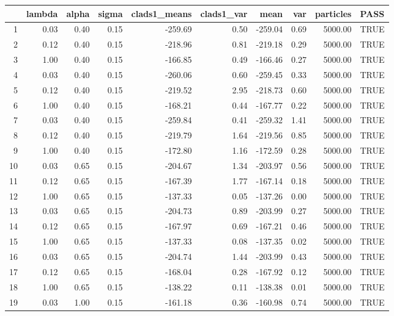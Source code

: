 \begin{table}[ht]
\centering
\begin{tabular}{rrrrrrrrrl}
  \hline
 & lambda & alpha & sigma & clads1\_means & clads1\_var & mean & var & particles & PASS \\ 
  \hline
1 & 0.03 & 0.40 & 0.15 & -259.69 & 0.50 & -259.04 & 0.69 & 5000.00 & TRUE \\ 
  2 & 0.12 & 0.40 & 0.15 & -218.96 & 0.81 & -219.18 & 0.29 & 5000.00 & TRUE \\ 
  3 & 1.00 & 0.40 & 0.15 & -166.85 & 0.49 & -166.46 & 0.27 & 5000.00 & TRUE \\ 
  4 & 0.03 & 0.40 & 0.15 & -260.06 & 0.60 & -259.45 & 0.33 & 5000.00 & TRUE \\ 
  5 & 0.12 & 0.40 & 0.15 & -219.52 & 2.95 & -218.73 & 0.60 & 5000.00 & TRUE \\ 
  6 & 1.00 & 0.40 & 0.15 & -168.21 & 0.44 & -167.77 & 0.22 & 5000.00 & TRUE \\ 
  7 & 0.03 & 0.40 & 0.15 & -259.84 & 0.41 & -259.32 & 1.41 & 5000.00 & TRUE \\ 
  8 & 0.12 & 0.40 & 0.15 & -219.79 & 1.64 & -219.56 & 0.85 & 5000.00 & TRUE \\ 
  9 & 1.00 & 0.40 & 0.15 & -172.80 & 1.16 & -172.59 & 0.28 & 5000.00 & TRUE \\ 
  10 & 0.03 & 0.65 & 0.15 & -204.67 & 1.34 & -203.97 & 0.56 & 5000.00 & TRUE \\ 
  11 & 0.12 & 0.65 & 0.15 & -167.39 & 1.77 & -167.14 & 0.18 & 5000.00 & TRUE \\ 
  12 & 1.00 & 0.65 & 0.15 & -137.33 & 0.05 & -137.26 & 0.00 & 5000.00 & TRUE \\ 
  13 & 0.03 & 0.65 & 0.15 & -204.73 & 0.89 & -203.99 & 0.27 & 5000.00 & TRUE \\ 
  14 & 0.12 & 0.65 & 0.15 & -167.97 & 0.69 & -167.21 & 0.46 & 5000.00 & TRUE \\ 
  15 & 1.00 & 0.65 & 0.15 & -137.33 & 0.08 & -137.35 & 0.02 & 5000.00 & TRUE \\ 
  16 & 0.03 & 0.65 & 0.15 & -204.74 & 1.44 & -203.99 & 0.43 & 5000.00 & TRUE \\ 
  17 & 0.12 & 0.65 & 0.15 & -168.04 & 0.28 & -167.92 & 0.12 & 5000.00 & TRUE \\ 
  18 & 1.00 & 0.65 & 0.15 & -138.22 & 0.11 & -138.38 & 0.01 & 5000.00 & TRUE \\ 
  19 & 0.03 & 1.00 & 0.15 & -161.18 & 0.36 & -160.98 & 0.74 & 5000.00 & TRUE \\ 

\end{tabular}
\end{table}
